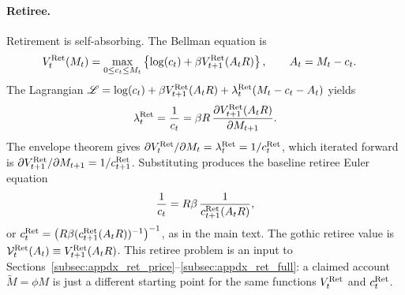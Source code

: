 \paragraph{Retiree.}
Retirement is self-absorbing. The Bellman equation is
\begin{align}
	V_t^{\mathrm{Ret}}(M_t)
	&= \max_{0\le c_t\le M_t}
	\left\{
		\log(c_t)+\beta V_{t+1}^{\mathrm{Ret}}(A_t R)
	\right\},
	\qquad A_t=M_t-c_t.
\end{align}
The Lagrangian $\mathscr{L}=\log(c_t)+\beta V_{t+1}^{\mathrm{Ret}}(A_t R)+\lambda_t^{\mathrm{Ret}}(M_t-c_t-A_t)$ yields
\begin{align}
	\lambda_t^{\mathrm{Ret}} = \frac{1}{c_t}
	= \beta R\,\frac{\partial V_{t+1}^{\mathrm{Ret}}(A_t R)}{\partial M_{t+1}}.
\end{align}
The envelope theorem gives $\partial V_t^{\mathrm{Ret}}/\partial M_t=\lambda_t^{\mathrm{Ret}}=1/c_t^{\mathrm{Ret}}$, which iterated forward is $\partial V_{t+1}^{\mathrm{Ret}}/\partial M_{t+1}=1/c_{t+1}^{\mathrm{Ret}}$. Substituting produces the baseline retiree Euler equation
\begin{align}
	\frac{1}{c_t}
	= R\beta\,\frac{1}{c_{t+1}^{\mathrm{Ret}}(A_t R)},
	\label{eq:ret_baseline_euler}
\end{align}
or $c_t^{\mathrm{Ret}}=\bigl(R\beta(c_{t+1}^{\mathrm{Ret}}(A_t R))^{-1}\bigr)^{-1}$, as in the main text. The gothic retiree value is $\mathcal{V}_t^{\mathrm{Ret}}(A_t)\equiv V_{t+1}^{\mathrm{Ret}}(A_t R)$. This retiree problem is an input to Sections~\ref{subsec:appdx_ret_price}--\ref{subsec:appdx_ret_full}: a claimed account $\tilde M=\phi M$ is just a different starting point for the same functions $V_t^{\mathrm{Ret}}$ and $c_t^{\mathrm{Ret}}$.

